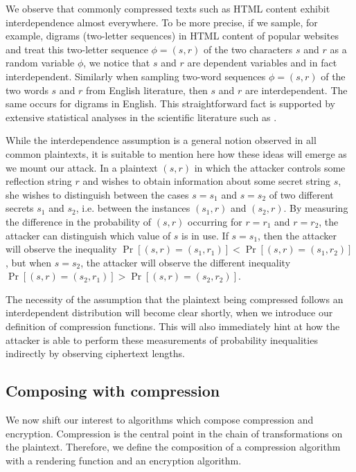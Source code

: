 \documentclass[conference, letterpaper, 10pt]{IEEEtran}
\begin{document}
We observe that commonly compressed texts such as HTML content exhibit
interdependence almost everywhere. To be more precise, if we sample, for
example, digrams (two-letter sequences) in HTML content of popular websites and
treat this two-letter sequence $\phi = (s, r)$ of the two characters $s$ and
$r$ as a random variable $\phi$, we notice that $s$ and $r$ are dependent
variables and in fact interdependent. Similarly when sampling two-word sequences
$\phi = (s, r)$ of the two words $s$ and $r$ from English literature, then $s$
and $r$ are interdependent. The same occurs for digrams in English. This
straightforward fact is supported by extensive statistical analyses in the
scientific literature such as \cite{c18}.

While the interdependence assumption is a general notion observed in all common
plaintexts, it is suitable to mention here how these ideas will emerge as we
mount our attack. In a plaintext $(s, r)$ in which the attacker controls some
reflection string $r$ and wishes to obtain information about some secret string
$s$, she wishes to distinguish between the cases $s = s_1$ and $s = s_2$ of two
different secrets $s_1$ and $s_2$, i.e. between the instances $(s_1, r)$ and
$(s_2, r)$. By measuring the difference in the probability of $(s, r)$
occurring for $r = r_1$ and $r = r_2$, the attacker can distinguish which value
of $s$ is in use. If $s = s_1$, then the attacker will observe the inequality
$\Pr[(s, r) = (s_1, r_1)] < \Pr[(s, r) = (s_1, r_2)]$, but when $s = s_2$, the
attacker will observe the different inequality $\Pr[(s, r) = (s_2, r_1)] >
\Pr[(s, r) = (s_2, r_2)]$.

The necessity of the assumption that the plaintext being compressed follows an
interdependent distribution will become clear shortly, when we introduce our
definition of compression functions. This will also immediately hint at how the
attacker is able to perform these measurements of probability inequalities
indirectly by observing ciphertext lengths.

\subsection{Composing with compression}\label{subsec:comcompose}

We now shift our interest to algorithms which compose compression and
encryption. Compression is the central point in the chain of transformations on
the plaintext. Therefore, we define the composition of a compression algorithm
with a rendering function and an encryption algorithm.
\end{document}
